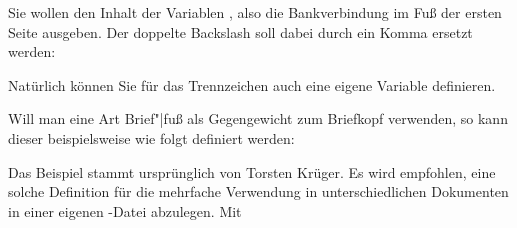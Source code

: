 %
\begin{Example}
  Sie wollen den Inhalt der Variablen ,
  also die Bankverbindung im Fuß der ersten Seite ausgeben. Der doppelte
  Backslash soll dabei durch ein Komma ersetzt werden:
\begin{lstcode}
\end{lstcode}
  Natürlich können Sie für das Trennzeichen auch eine eigene Variable
  definieren.%
  \iffalse %
  Ich überlasse dem Leser dies als Übung.%
  \fi%
  
  Will man eine Art Brief"|fuß als Gegengewicht zum Briefkopf verwenden, so
  kann dieser beispielsweise wie folgt definiert werden:
\begin{lstcode}
\end{lstcode}
  Das Beispiel stammt ursprünglich von Torsten Krüger. Es wird empfohlen, eine
  solche Definition für die mehrfache Verwendung in unterschiedlichen
  Dokumenten in einer eigenen
  -Datei abzulegen. Mit
\begin{lstcode}
\end{lstcode}
\end{Example}
